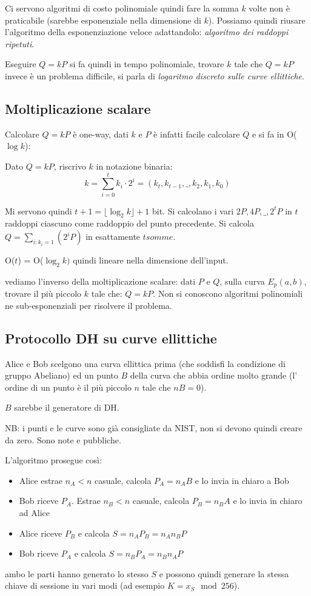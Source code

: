 Ci servono algoritmi di costo polinomiale quindi fare la somma $k$ volte non è praticabile (sarebbe esponenziale nella dimensione di $k$).
Possiamo quindi riusare l'algoritmo della esponenziazione veloce adattandolo: \emph{algoritmo dei raddoppi ripetuti}.

Eseguire $Q = kP$ si fa quindi in tempo polinomiale, trovare $k$ tale che $Q = kP$ invece è un problema difficile, si parla di \emph{logaritmo discreto sulle curve ellittiche}.

\subsection{Moltiplicazione scalare}
Calcolare $Q = kP$ è one-way, dati $k$ e $P$ è infatti facile calcolare $Q$ e si fa in O($\log k$):

Dato $Q = kP$, riscrivo $k$ in notazione binaria: 
$$ k = \sum_{i=0}^{t}k_i \cdot 2^i = (k_t,k_{t-1},\_,k_2,k_1,k_0) $$

Mi servono quindi $t+1 = \lfloor \log_2 k \rfloor + 1$ bit.
Si calcolano i vari $2P, 4P, \_, 2^tP$ in $t$ raddoppi ciascuno come raddoppio del punto precedente.
Si calcola $Q = \sum_{i : k_i = 1} (2^iP)$ in esattamente $t somme$.

O($t$) = O($\log_2 k)$ quindi lineare nella dimensione dell'input.

vediamo l'inverso della moltiplicazione scalare: dati $P$ e $Q$, sulla curva $E_p(a,b)$, trovare il più piccolo $k$ tale che: $Q = kP$. Non si conoscono algoritmi polinomiali ne sub-esponenziali per risolvere il problema.

\subsection{Protocollo DH su curve ellittiche}
Alice e Bob scelgono una curva ellittica prima (che soddisfi la condizione di gruppo Abeliano) ed un punto $B$ della curva che abbia ordine molto grande (l' ordine di un punto è il più piccolo $n$ tale che $nB=0$).

$B$ sarebbe il generatore di DH.

NB: i punti e le curve sono già consigliate da NIST, non si devono quindi creare da zero.
Sono note e pubbliche.

L'algoritmo prosegue così:
\begin{itemize}
    \item Alice estrae $n_A < n$ casuale, calcola $P_A = n_AB$ e lo invia in chiaro a Bob
    \item Bob riceve $P_A$. Estrae $n_B < n$ casuale, calcola $P_B = n_BA$ e lo invia in chiaro ad Alice
    \item Alice riceve $P_B$ e calcola $S = n_AP_B = n_An_BP$
    \item Bob riceve $P_A$ e calcola $S = n_BP_A = n_Bn_AP$
\end{itemize}
ambo le parti hanno generato lo stesso $S$ e possono quindi generare la stessa chiave di sessione in vari modi (ad esempio $K = x_S \mod 256$).

